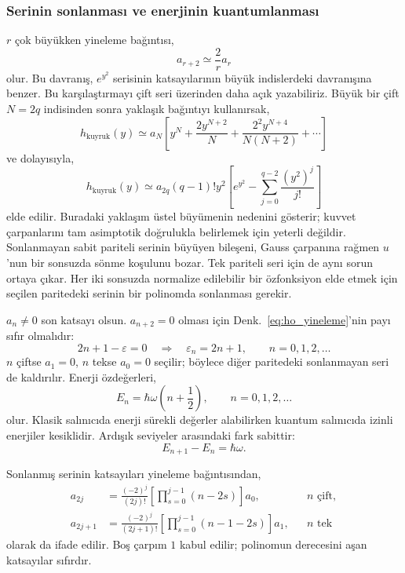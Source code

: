 \documentclass[00_kitap.tex]{subfiles}
\begin{document}
\subsubsection{Serinin sonlanması ve enerjinin kuantumlanması}

$r$ çok büyükken yineleme bağıntısı,
\begin{equation}
 a_{r+2}\simeq\frac{2}{r}a_r
\end{equation}
olur. Bu davranış, $e^{y^2}$ serisinin katsayılarının büyük
indislerdeki davranışına benzer. Bu karşılaştırmayı
çift seri üzerinden daha açık yazabiliriz. Büyük bir çift $N=2q$
indisinden sonra yaklaşık bağıntıyı kullanırsak,
\begin{equation}
 h_{\text{kuyruk}}(y)\simeq
 a_N\left[y^N+\frac{2y^{N+2}}{N}
     +\frac{2^2y^{N+4}}{N(N+2)}+\cdots\right]
\end{equation}
ve dolayısıyla,
\begin{equation}
 h_{\text{kuyruk}}(y)\simeq
 a_{2q}(q-1)!y^2
 \left[e^{y^2}-\sum_{j=0}^{q-2}\frac{(y^2)^j}{j!}\right]
\end{equation}
elde edilir. Buradaki yaklaşım üstel büyümenin nedenini gösterir;
kuvvet çarpanlarını tam asimptotik doğrulukla belirlemek için yeterli
değildir. Sonlanmayan sabit pariteli serinin büyüyen bileşeni,
Gauss çarpanına rağmen $u$'nun bir sonsuzda sönme koşulunu bozar.
Tek pariteli seri için de aynı sorun ortaya çıkar. Her iki sonsuzda
normalize edilebilir bir özfonksiyon elde etmek için seçilen paritedeki
serinin bir polinomda sonlanması gerekir.

$a_n\ne0$ son katsayı olsun. $a_{n+2}=0$ olması için
Denk.~\eqref{eq:ho_yineleme}'nin payı sıfır olmalıdır:
\begin{equation}
 2n+1-\varepsilon=0
 \quad\Longrightarrow\quad \varepsilon_n=2n+1,
 \qquad n=0,1,2,\ldots
\end{equation}
$n$ çiftse $a_1=0$, $n$ tekse $a_0=0$ seçilir; böylece diğer
paritedeki sonlanmayan seri de kaldırılır. Enerji özdeğerleri,
\begin{equation}
 \boxed{E_n=\hbar\omega\left(n+\frac12\right),
 \qquad n=0,1,2,\ldots}
 \label{eq:ho_enerjiler}
\end{equation}
olur. Klasik salınıcıda enerji sürekli değerler alabilirken kuantum
salınıcıda izinli enerjiler kesiklidir. Ardışık seviyeler arasındaki
fark sabittir:
\begin{equation}
 E_{n+1}-E_n=\hbar\omega.
\end{equation}

Sonlanmış serinin katsayıları yineleme bağıntısından,
\begin{align}
 a_{2j}&=\frac{(-2)^j}{(2j)!}
       \left[\prod_{s=0}^{j-1}(n-2s)\right]a_0,
       && n\text{ çift},\\
 a_{2j+1}&=\frac{(-2)^j}{(2j+1)!}
       \left[\prod_{s=0}^{j-1}(n-1-2s)\right]a_1,
       && n\text{ tek}
\end{align}
olarak da ifade edilir. Boş çarpım $1$ kabul edilir; polinomun
derecesini aşan katsayılar sıfırdır.
\end{document}
